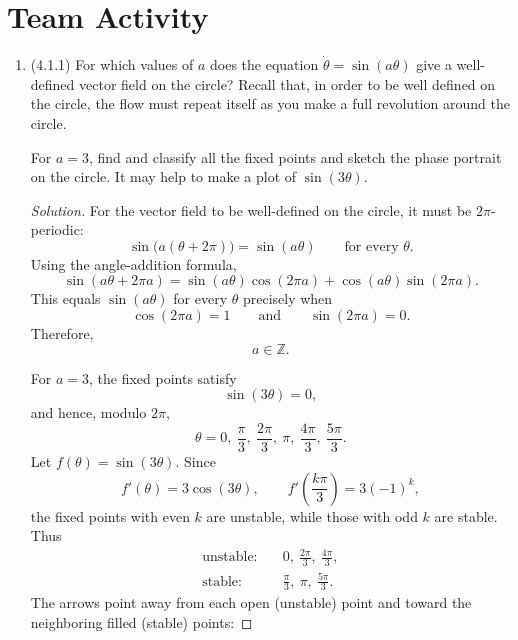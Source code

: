 \documentclass[12pt]{amsart}
\theoremstyle{conjecture}
\theoremstyle{definition}
\theoremstyle{question}
\theoremstyle{theorem}
\newenvironment{solution}
{\begin{proof}[Solution]}
{\end{proof}}
\begin{document}
    \section*{Team Activity}
    \begin{enumerate}
        \item (4.1.1) For which values of $a$ does the equation $\dot\theta=\sin(a\theta)$ give a well-defined
        vector field on the circle? Recall that, in order to be well defined on the circle, the flow must repeat
        itself as you make a full revolution around the circle.

        For $a=3$, find and classify all the fixed points and sketch the phase portrait on the circle. It may
        help to make a plot of $\sin(3\theta)$.

        \begin{solution}
            For the vector field to be well-defined on the circle, it must be
            $2\pi$-periodic:
            \[
                \sin\bigl(a(\theta+2\pi)\bigr)=\sin(a\theta)
                \qquad\text{for every }\theta.
            \]
            Using the angle-addition formula,
            \[
                \sin(a\theta+2\pi a)
                =\sin(a\theta)\cos(2\pi a)
                +\cos(a\theta)\sin(2\pi a).
            \]
            This equals $\sin(a\theta)$ for every $\theta$ precisely when
            \[
                \cos(2\pi a)=1
                \qquad\text{and}\qquad
                \sin(2\pi a)=0.
            \]
            Therefore,
            \[
                \boxed{a\in\mathbb{Z}}.
            \]

            For $a=3$, the fixed points satisfy
            \[
                \sin(3\theta)=0,
            \]
            and hence, modulo $2\pi$,
            \[
                \theta=0,\ \frac{\pi}{3},\ \frac{2\pi}{3},\
                \pi,\ \frac{4\pi}{3},\ \frac{5\pi}{3}.
            \]
            Let $f(\theta)=\sin(3\theta)$. Since
            \[
                f'(\theta)=3\cos(3\theta),
                \qquad
                f'\left(\frac{k\pi}{3}\right)=3(-1)^k,
            \]
            the fixed points with even $k$ are unstable, while those with odd
            $k$ are stable. Thus
            \[
                \boxed{
                    \begin{aligned}
                        \text{unstable:}\quad&0,\ \frac{2\pi}{3},\ \frac{4\pi}{3},\\
                        \text{stable:}\quad&\frac{\pi}{3},\ \pi,\ \frac{5\pi}{3}.
                    \end{aligned}}
            \]
            The arrows point away from each open (unstable) point and toward the
            neighboring filled (stable) points:


\end{solution}
\end{enumerate}
\end{document}

